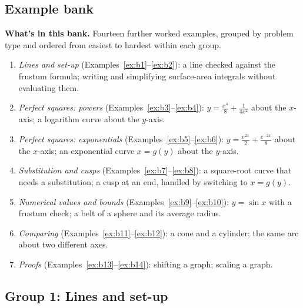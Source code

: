 \documentclass[11pt]{article}
\begin{document}
\subsection*{Example bank}

\textbf{What's in this bank.} Fourteen further worked examples, grouped by problem type and ordered from easiest to hardest within each group.
\begin{enumerate}[nosep]
  \item \emph{Lines and set-up} (Examples~\ref{ex:b1}--\ref{ex:b2}): a line checked against the frustum formula; writing and simplifying surface-area integrals without evaluating them.
  \item \emph{Perfect squares: powers} (Examples~\ref{ex:b3}--\ref{ex:b4}): $y=\frac{x^4}8+\frac1{4x^2}$ about the $x$-axis; a logarithm curve about the $y$-axis.
  \item \emph{Perfect squares: exponentials} (Examples~\ref{ex:b5}--\ref{ex:b6}): $y=\frac{e^{2x}}2+\frac{e^{-2x}}8$ about the $x$-axis; an exponential curve $x=g(y)$ about the $y$-axis.
  \item \emph{Substitution and cusps} (Examples~\ref{ex:b7}--\ref{ex:b8}): a square-root curve that needs a substitution; a cusp at an end, handled by switching to $x=g(y)$.
  \item \emph{Numerical values and bounds} (Examples~\ref{ex:b9}--\ref{ex:b10}): $y=\sin x$ with a frustum check; a belt of a sphere and its average radius.
  \item \emph{Comparing} (Examples~\ref{ex:b11}--\ref{ex:b12}): a cone and a cylinder; the same arc about two different axes.
  \item \emph{Proofs} (Examples~\ref{ex:b13}--\ref{ex:b14}): shifting a graph; scaling a graph.
\end{enumerate}

\subsection*{Group 1: Lines and set-up}
\end{document}
